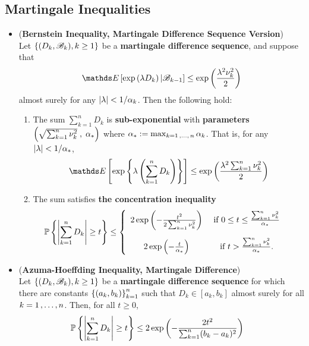 \documentclass[11pt]{article}
\begin{document}
\subsection{Martingale Inequalities}
\begin{itemize}
\item \begin{proposition} (\textbf{Bernstein Inequality, Martingale Difference Sequence Version}) \citep{wainwright2019high}\\
Let $\left\{(D_k, {\mathscr B}_k), k \ge 1\right\}$ be a \textbf{martingale difference sequence}, and suppose that 
\begin{align*}
\E{}{\exp\paren{\lambda D_k} | \srB_{k-1}} \le \exp\paren{\frac{\lambda^2 \nu_k^2}{2} }
\end{align*} almost surely for any $\left\lvert \lambda \right\rvert < 1/\alpha_k$. Then the following hold:
\begin{enumerate}
\item The sum $\sum_{k=1}^{n}D_k$ is \textbf{sub-exponential} with \textbf{parameters} $\left(\sqrt{\sum_{k=1}^{n}\nu_k^2}\;  , \;\alpha_{*}\right)$ where $\alpha_{*} := \max_{k=1 \,{,}\ldots{,}\, n} \alpha_k$. That is, for any $\left\lvert \lambda \right\rvert < 1/\alpha_{*}$, 
\begin{align*}
\E{}{\exp\set{\lambda \paren{\sum_{k=1}^{n}D_k}}} \le \exp\paren{\frac{\lambda^2\sum_{k=1}^{n}\nu_k^2}{2} }
\end{align*}
\item The sum satisfies \textbf{the concentration inequality}
\begin{align}
{\mathbb P}\left\{\left\lvert \sum_{k=1}^{n}D_k \right\rvert \ge t \right\} &\le \left\{ \begin{array}{cc}
2 \exp\left(- \frac{t^2}{2 \sum_{k=1}^{n}\nu_k^2}\right) & \text{ if } 0 \le t \le \frac{\sum_{k=1}^{n}\nu_k^2}{\alpha_{*}} \\[15pt]
2 \exp\left(- \frac{t}{\alpha_{*}}\right) &\text{ if } t > \frac{\sum_{k=1}^{n}\nu_k^2}{\alpha_{*}}.
\end{array}\right. \label{ineqn: bernstein_inequality_martingale}
\end{align}
\end{enumerate}
\end{proposition}

\item \begin{corollary} (\textbf{Azuma-Hoeffding Inequality, Martingale Difference})\citep{wainwright2019high}\\
Let $\left\{(D_k, {\mathscr B}_k), k \ge 1\right\}$ be a \textbf{martingale difference sequence} for which there are constants $\left\{(a_k, b_k)\right\}^{n}_{k=1}$ such that $D_k \in [a_k, b_k]$ almost surely for all $k = 1 \,{,}\ldots{,}\, n$. Then, for all $t \ge 0$,
\begin{align}
{\mathbb P}\left\{\left\lvert \sum_{k=1}^{n}D_k \right\rvert \ge t \right\} &\le  2 \exp\left(- \frac{2 t^2}{ \sum_{k=1}^{n}(b_k - a_k)^2}\right) \label{ineqn: hoeffding_inequality_martingale}
\end{align}
\end{corollary}


\end{itemize}
\end{document}
